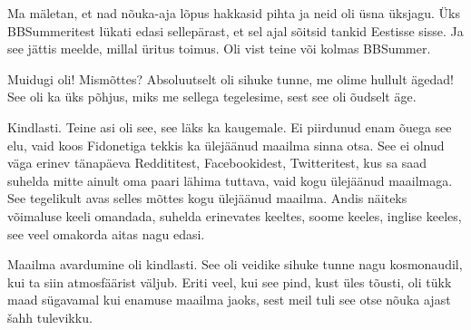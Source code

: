 Ma mäletan, et nad nõuka-aja lõpus hakkasid pihta ja neid oli üsna üksjagu. Üks BBSummeritest lükati edasi sellepärast, et sel ajal sõitsid tankid Eestisse sisse. Ja see jättis meelde, millal üritus toimus. Oli vist teine või kolmas BBSummer.
                 

Muidugi oli! Mismõttes? Absoluutselt oli sihuke tunne, me olime hullult ägedad! See oli ka üks põhjus, miks me sellega tegelesime, sest see oli õudselt äge.


Kindlasti. Teine asi oli see, see läks ka kaugemale. Ei piirdunud enam õuega see elu, vaid koos Fidonetiga tekkis ka ülejäänud maailma sinna otsa. See ei olnud väga erinev tänapäeva Reddititest, Facebookidest, Twitteritest, kus sa saad suhelda mitte ainult oma paari lähima tuttava, vaid kogu ülejäänud maailmaga. See tegelikult avas selles mõttes kogu ülejäänud maailma. Andis näiteks võimaluse keeli omandada,  suhelda  erinevates keeltes, soome keeles, inglise keeles, see veel omakorda aitas nagu edasi.
                 

Maailma avardumine oli kindlasti. See oli veidike sihuke tunne nagu kosmonaudil, kui ta siin atmosfäärist väljub. Eriti veel, kui see pind, kust üles tõusti, oli tükk maad sügavamal kui enamuse maailma jaoks, sest meil tuli see otse nõuka ajast šahh tulevikku.


